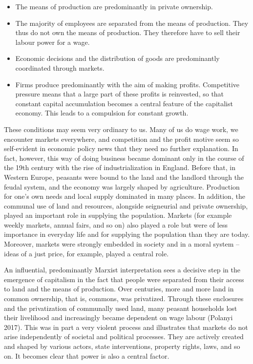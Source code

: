 \documentclass[
  british,
  a4paper,
  DIV=11,
  numbers=noendperiod,
  oneside,
  openany]{scrreprt}
\begin{document}
\begin{itemize}
\item
  The means of production are predominantly in private ownership.
\item
  The majority of employees are separated from the means of production.
  They thus do not own the means of production. They therefore have to
  sell their labour power for a wage.
\item
  Economic decisions and the distribution of goods are predominantly
  coordinated through markets.
\item
  Firms produce predominantly with the aim of making profits.
  Competitive pressure means that a large part of these profits is
  reinvested, so that constant capital accumulation becomes a central
  feature of the capitalist economy. This leads to a compulsion for
  constant growth.
\end{itemize}

These conditions may seem very ordinary to us. Many of us do wage work,
we encounter markets everywhere, and competition and the profit motive
seem so self-evident in economic policy news that they need no further
explanation. In fact, however, this way of doing business became
dominant only in the course of the 19th century with the rise of
industrialization in England. Before that, in Western Europe, peasants
were bound to the land and the landlord through the feudal system, and
the economy was largely shaped by agriculture. Production for one's own
needs and local supply dominated in many places. In addition, the
communal use of land and resources, alongside seigneurial and private
ownership, played an important role in supplying the population. Markets
(for example weekly markets, annual fairs, and so on) also played a role
but were of less importance in everyday life and for supplying the
population than they are today. Moreover, markets were strongly embedded
in society and in a moral system -- ideas of a just price, for example,
played a central role.

An influential, predominantly Marxist interpretation sees a decisive
step in the emergence of capitalism in the fact that people were
separated from their access to land and the means of production. Over
centuries, more and more land in common ownership, that is, commons, was
privatized. Through these enclosures and the privatization of communally
used land, many peasant households lost their livelihood and
increasingly became dependent on wage labour (Polanyi 2017). This was in
part a very violent process and illustrates that markets do not arise
independently of societal and political processes. They are actively
created and shaped by various actors, state interventions, property
rights, laws, and so on. It becomes clear that power is also a central
factor.
\end{document}
